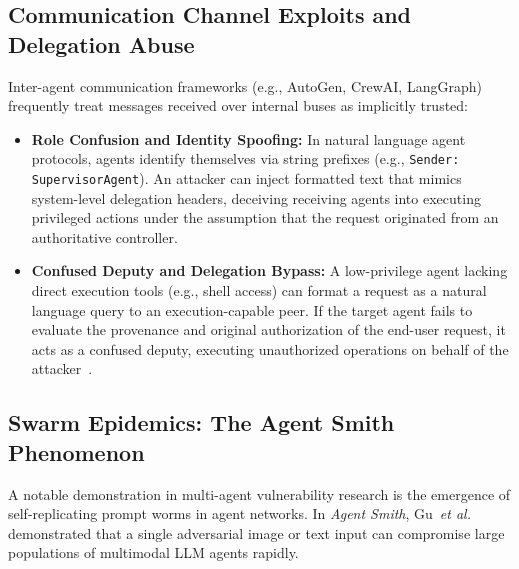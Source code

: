 \subsection{Communication Channel Exploits and Delegation Abuse}
\label{subsec:communication_exploits}

Inter-agent communication frameworks (e.g., AutoGen, CrewAI, LangGraph) frequently treat messages received over internal buses as implicitly trusted:
\begin{itemize}
    \item \textbf{Role Confusion and Identity Spoofing:} In natural language agent protocols, agents identify themselves via string prefixes (e.g., \texttt{Sender: SupervisorAgent}). An attacker can inject formatted text that mimics system-level delegation headers, deceiving receiving agents into executing privileged actions under the assumption that the request originated from an authoritative controller.
    \item \textbf{Confused Deputy and Delegation Bypass:} A low-privilege agent lacking direct execution tools (e.g., shell access) can format a request as a natural language query to an execution-capable peer. If the target agent fails to evaluate the provenance and original authorization of the end-user request, it acts as a confused deputy, executing unauthorized operations on behalf of the attacker~\cite{dehghantanha2026sok}.
\end{itemize}

\subsection{Swarm Epidemics: The Agent Smith Phenomenon}
\label{subsec:swarm_epidemics}

A notable demonstration in multi-agent vulnerability research is the emergence of self-replicating prompt worms in agent networks. In \textit{Agent Smith}, Gu~\textit{et al.}~\cite{gu2024agent} demonstrated that a single adversarial image or text input can compromise large populations of multimodal LLM agents rapidly. 

